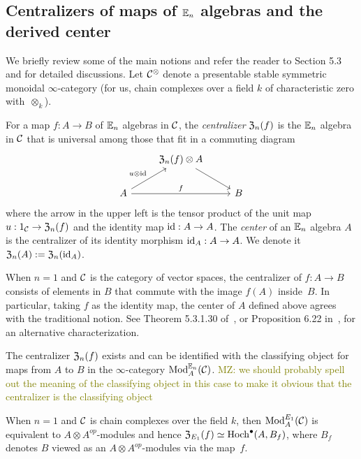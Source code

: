 \documentclass[11pt]{amsart}
\numberwithin{equation}{section}
\def\mahmoud{\textcolor{olive}{MZ: }\textcolor{olive}}
\begin{document}
\subsection{Centralizers of maps of $\mathbb E_n$ algebras and the derived center}
\label{sec: centralizer}

We briefly review some of the main notions and refer the reader to \cite{LurieHA} Section 5.3 and \cite{FrancisHH} for detailed discussions. Let $\mathcal C^\otimes$ denote a presentable stable symmetric monoidal $\infty$-category (for us, chain complexes over a field $k$ of characteristic zero with~$\otimes_k$).

\begin{dfn}\label{D:centralizer}
For a map $f: A \to B$ of $\mathbb E_n$ algebras in $\mathcal C$, 
the {\em centralizer} ${\frak Z}_n(f)$ is the $\mathbb E_n$ algebra in $\mathcal C$ that is universal among those that fit in a commuting diagram
\[
\begin{tikzcd}
& {\frak Z}_n(f) \otimes A \arrow[dr] & \\
A \arrow[ur, "u \otimes \id"] \arrow[rr, "f"] && B
\end{tikzcd}
\]
where the arrow in the upper left is the tensor product of the unit map $u: 1_\mathcal C \to {\frak Z}_n(f)$ and the identity map ${\rm id}: A \to A$.
The {\em center} of an $\mathbb E_n$ algebra $A$ is the centralizer of its identity morphism ${\rm id}_A: A \to A$. 
We  denote it ${\frak Z}_n(A) := {\frak Z}_n({\rm id}_A)$.
\end{dfn}

When $n=1$ and $\mathcal C$ is the category of vector spaces, 
the centralizer of $f: A \to B$ consists of elements in $B$ that commute with the image $f(A)$ inside~$B$. 
In particular, taking $f$ as the identity map, 
the center of $A$ defined above agrees with the traditional notion. 
See Theorem 5.3.1.30 of~\cite{LurieHA}, or Proposition 6.22 in~\cite{GTZ3}, for an alternative characterization.

\begin{prp}
\label{T:centralizer=inthom} 
The centralizer ${\frak Z}_n(f)$ exists and can be identified with the classifying object for maps from $A$ to $B$ in the $\infty$-category ${\rm Mod}^{\mathbb E_n}_A(\mathcal C)$. \mahmoud{we should probably spell out the meaning of the classifying object in this case to make it obvious that the centralizer is the classifying object}
\end{prp} 

When $n=1$ and $\mathcal C$ is chain complexes over the field $k$, then ${\rm Mod}^{E_1}_A(\mathcal C)$ is equivalent to $A\otimes A^{op}$-modules and hence ${\frak Z}_{E_1}(f) \simeq {\rm Hoch}^\bullet(A,B_f)$,
where $B_f$ denotes $B$ viewed as an $A\otimes A^{op}$-modules via the map~$f$.
\end{document}
